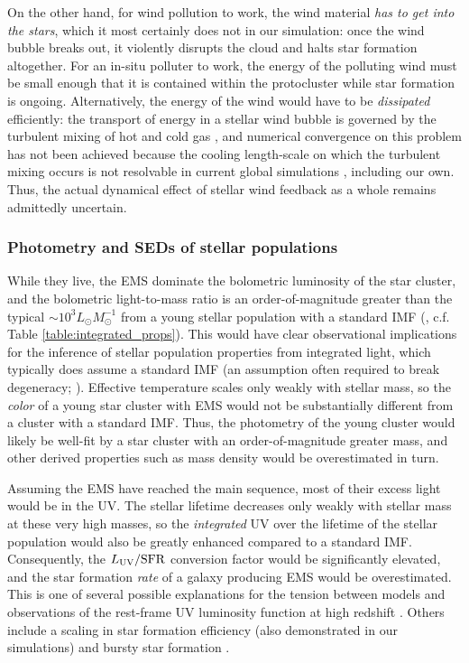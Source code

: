 \documentclass[apjl,twocolumn]{openjournal}
\begin{document}
On the other hand, for wind pollution to work, the wind material {\it has to get into the stars}, which it most certainly does not in our simulation: once the wind bubble breaks out, it violently disrupts the cloud and halts star formation altogether. For an in-situ polluter to work, the energy of the polluting wind must be small enough that it is contained within the protocluster while star formation is ongoing. Alternatively, the energy of the wind would have to be {\it dissipated} efficiently: the transport of energy in a stellar wind bubble is governed by the turbulent mixing of hot and cold gas \citep{lancaster:2021.wind.sims}, and numerical convergence on this problem has not been achieved because the cooling length-scale on which the turbulent mixing occurs is not resolvable in current global simulations \citep{lancaster:2024.wind.bubbles}, including our own. Thus, the actual dynamical effect of stellar wind feedback as a whole remains admittedly uncertain.

\subsubsection{Photometry and SEDs of stellar populations}
While they live, the EMS dominate the bolometric luminosity of the star cluster, and the bolometric light-to-mass ratio is an order-of-magnitude greater than the typical $\sim 10^3 L_\odot M_\odot^{-1}$ from a young stellar population with a standard IMF (\citealt{starburst99}, c.f. Table \ref{table:integrated_props}). This would have clear observational implications for the inference of stellar population properties from integrated light, which typically does assume a standard IMF (an assumption often required to break degeneracy; \citealt{ashworth:2017.cluster.photometry.degeneracy}). Effective temperature scales only weakly with stellar mass, so the {\it color} of a young star cluster with EMS would not be substantially different from a cluster with a standard IMF. Thus, the photometry of the young cluster would likely be well-fit by a star cluster with an order-of-magnitude greater mass, and other derived properties such as mass density would be overestimated in turn.

Assuming the EMS have reached the main sequence, most of their excess light would be in the UV. The stellar lifetime decreases only weakly with stellar mass at these very high masses, so the {\it integrated} UV over the lifetime of the stellar population would also be greatly enhanced compared to a standard IMF. Consequently, the $L_{\rm UV}/\rm SFR$ conversion factor would be significantly elevated, and the star formation {\it rate} of a galaxy producing EMS would be overestimated. This is one of several possible explanations for the tension between models and observations of the rest-frame UV luminosity function at high redshift \citep{harikane:2023.uvlf}. Others include a scaling in star formation efficiency \citep{somerville:2025.hiz.sfe} (also demonstrated in our simulations) and bursty star formation \citep{sun:2023.bursty.sf}.
\end{document}
